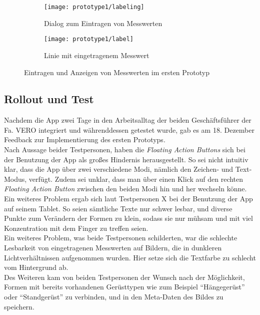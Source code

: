 \begin{figure}[h]
  \begin{subfigure}[t]{0.4\textwidth}
    \texttt{[image: prototype1/labeling]}
    \caption{Dialog zum Eintragen von Messwerten}
    \label{fig:labeling1}
  \end{subfigure}
  \begin{subfigure}[t]{0.4\textwidth}
    \texttt{[image: prototype1/label]}
    \caption{Linie mit eingetragenem Messwert}
    \label{fig:label1}
  \end{subfigure}
  \centering
  \caption{Eintragen und Anzeigen von Messwerten im ersten Prototyp}
\end{figure}

\subsection{Rollout und Test}\label{subsec:test1}
Nachdem die App zwei Tage in den Arbeitsalltag der beiden Geschäftsführer der Fa. VERO integriert und währenddessen getestet wurde, gab es am 18. Dezember Feedback zur Implementierung des ersten Prototyps. \\

Nach Aussage beider Testpersonen, haben die \emph{Floating Action Buttons} sich bei der Benutzung der App als großes Hindernis herausgestellt.
So sei nicht intuitiv klar, dass die App über zwei verschiedene Modi, nämlich den Zeichen- und Text-Modus, verfügt.
Zudem sei unklar, dass man über einen Klick auf den rechten \emph{Floating Action Button} zwischen den beiden Modi hin und her wechseln könne. \\

Ein weiteres Problem ergab sich laut Testpersonen X  bei der Benutzung der App auf seinem Tablet.
So seien sämtliche Texte nur schwer lesbar, und diverse Punkte zum Verändern der Formen zu klein, sodass sie nur mühsam und mit viel Konzentration mit dem Finger zu treffen seien. \\

Ein weiteres Problem, was beide Testpersonen schilderten, war die schlechte Lesbarkeit von eingetragenen Messwerten auf Bildern, die in dunkleren Lichtverhältnissen aufgenommen wurden.
Hier setze sich die Textfarbe zu schlecht vom Hintergrund ab. \\

Des Weiteren kam von beiden Testpersonen der Wunsch nach der Möglichkeit, Formen mit bereits vorhandenen Gerüsttypen wie zum Beispiel ``Hängegerüst'' oder ``Standgerüst'' zu verbinden, und in den Meta-Daten des Bildes zu speichern. \\

